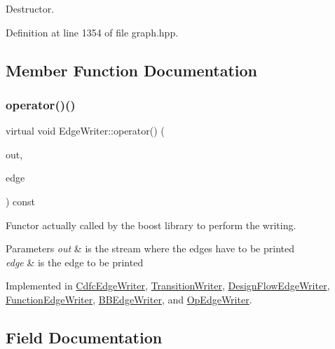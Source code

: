 Destructor. 



Definition at line 1354 of file graph.\+hpp.



\subsection{Member Function Documentation}
\mbox{\label{classEdgeWriter_a04dc5b68a11dcf253e21d29dfd1e06c3}} 
\subsubsection{\texorpdfstring{operator()()}{operator()()}}
{\footnotesize\ttfamily virtual void Edge\+Writer\+::operator() (\begin{DoxyParamCaption}\item[{std\+::ostream \&}]{out,  }\item[{const \hyperlink{graph_8hpp_a9eb9afea34e09f484b21f2efd263dd48}{Edge\+Descriptor} \&}]{edge }\end{DoxyParamCaption}) const\hspace{0.3cm}{\ttfamily [pure virtual]}}



Functor actually called by the boost library to perform the writing. 


\begin{DoxyParams}{Parameters}
{\em out} & is the stream where the edges have to be printed \\
\hline
{\em edge} & is the edge to be printed \\
\hline
\end{DoxyParams}


Implemented in \hyperlink{classCdfcEdgeWriter_ad2a0011f644764bd10dc0f77da897a52}{Cdfc\+Edge\+Writer}, \hyperlink{classTransitionWriter_a6df1e95524ed8a5e00264577f75e54c5}{Transition\+Writer}, \hyperlink{classDesignFlowEdgeWriter_ae15c12d95676a26eb77a96356000007e}{Design\+Flow\+Edge\+Writer}, \hyperlink{classFunctionEdgeWriter_afadc175ca3b7ff6076556dc850cacfa2}{Function\+Edge\+Writer}, \hyperlink{classBBEdgeWriter_a9f9d0af976dfe274cc81eecd9c28d832}{B\+B\+Edge\+Writer}, and \hyperlink{classOpEdgeWriter_af4383267715e988b7eaa5468ad6023fb}{Op\+Edge\+Writer}.



\subsection{Field Documentation}
\mbox{\label{classEdgeWriter_a74d56c5b98f85a8141d854cfb392e553}} 
